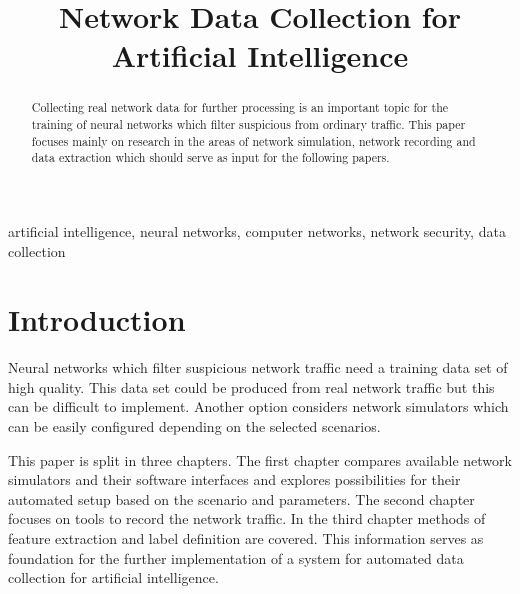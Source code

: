 \documentclass[conference]{IEEEtran}
\begin{document}
\title{Network Data Collection for Artificial Intelligence}

\author{
\and
{}
\and
{}
}

\maketitle

\begin{abstract}
Collecting real network data for further processing is an important topic for the training of neural networks which filter suspicious from ordinary traffic. This paper focuses mainly on research in the areas of network simulation, network recording and data extraction which should serve as input for the following papers.
\end{abstract}

\begin{IEEEkeywords}
artificial intelligence, neural networks, computer networks, network security, data collection
\end{IEEEkeywords}

\section{Introduction}
Neural networks which filter suspicious network traffic need a training data set of high quality. This data set could be produced from real network traffic but this can be difficult to implement. Another option considers network simulators which can be easily configured depending on the selected scenarios.

This paper is split in three chapters. The first chapter compares available network simulators and their software interfaces and explores possibilities for their automated setup based on the scenario and parameters. The second chapter focuses on tools to record the network traffic. In the third chapter methods of feature extraction and label definition are covered. This information serves as foundation for the further implementation of a system for automated data collection for artificial intelligence.
\end{document}
